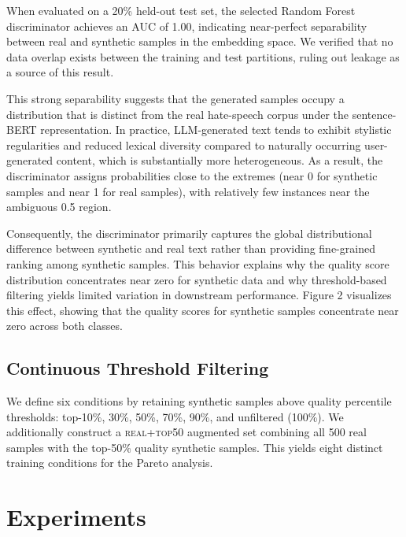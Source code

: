 \documentclass[11pt]{article}
\begin{document}
When evaluated on a 20\% held-out test set, the selected Random Forest discriminator achieves an AUC of 1.00, indicating near-perfect separability between real and synthetic samples in the embedding space. We verified that no data overlap exists between the training and test partitions, ruling out leakage as a source of this result.

This strong separability suggests that the generated samples occupy a distribution that is distinct from the real hate-speech corpus under the sentence-BERT representation. In practice, LLM-generated text tends to exhibit stylistic regularities and reduced lexical diversity compared to naturally occurring user-generated content, which is substantially more heterogeneous. As a result, the discriminator assigns probabilities close to the extremes (near 0 for synthetic samples and near 1 for real samples), with relatively few instances near the ambiguous 0.5 region.

Consequently, the discriminator primarily captures the global distributional difference between synthetic and real text rather than providing fine-grained ranking among synthetic samples. This behavior explains why the quality score distribution concentrates near zero for synthetic data and why threshold-based filtering yields limited variation in downstream performance. Figure 2 visualizes this effect, showing that the quality scores for synthetic samples concentrate near zero across both classes.


\subsection{Continuous Threshold Filtering}
We define six conditions by retaining synthetic samples above quality percentile thresholds:
top-10\%, 30\%, 50\%, 70\%, 90\%, and unfiltered (100\%).
We additionally construct a \textsc{real+top50} augmented set combining all 500 real samples
with the top-50\% quality synthetic samples.
This yields eight distinct training conditions for the Pareto analysis.

\section{Experiments}
\label{sec:experiments}
\end{document}
